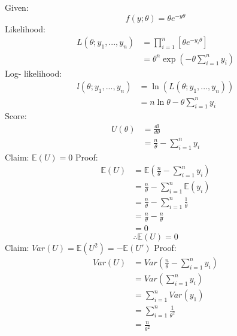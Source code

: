 \documentclass[a4paper]{article}
\begin{document}
\newpage
\section{}
	Given:
		\[f(y;\theta) = \theta e^{-y\theta}\]
	Likelihood:
		\begin{equation*}
			\begin{split}
				L(\theta; y_1, ... ,y_n) &= \prod_{i=1}^n \left[\theta e^{-y_i \theta}\right]\\
				&= \theta^n \exp\left(-\theta\sum_{i=1}^n y_i\right)
			\end{split}
		\end{equation*}
	Log- likelihood:
		\begin{equation*}
			\begin{split}
				l(\theta; y_1, ... ,y_n) &= \ln(L(\theta; y_1, ... ,y_n))\\
				&= n\ln\theta - \theta\sum_{i=1}^n y_i
			\end{split}
		\end{equation*}
	Score:
		\begin{equation*}
			\begin{split}
				U(\theta) &= \frac{dl}{d\theta}\\
				&= \frac{n}{\theta} - \sum_{i=1}^n y_i
			\end{split}
		\end{equation*}
	Claim: \(\mathbb{E}(U) = 0\)\newline
	Proof:
		\begin{equation*}
			\begin{split}
				\mathbb{E}(U) &= \mathbb{E}\left(\frac{n}{\theta}-\sum_{i=1}^n y_i\right)\\
				&= \frac{n}{\theta} - \sum_{i=1}^n\mathbb{E}(y_i)\\
				&= \frac{n}{\theta} - \sum_{i=1}^n \frac{1}{\theta}\\
				&= \frac{n}{\theta} - \frac{n}{\theta}\\
				&= 0
			\end{split}
		\end{equation*}
		\[\therefore \mathbb{E}(U) = 0\]
	\newpage
	Claim: \(Var(U) = \mathbb{E}(U^2) = -\mathbb{E}(U')\) \newline
	Proof:
		\begin{equation*}
			\begin{split}
				Var(U) &= Var\left(\frac{n}{\theta} - \sum_{i=1}^n y_i\right)\\
				&= Var\left(\sum_{i=1}^n y_i\right)\\
				&= \sum_{i=1}^n Var(y_1)\\
				&= \sum_{i=1}^n \frac{1}{\theta^2}\\
				&= \frac{n}{\theta^2}
			\end{split}
		\end{equation*}
\end{document}
